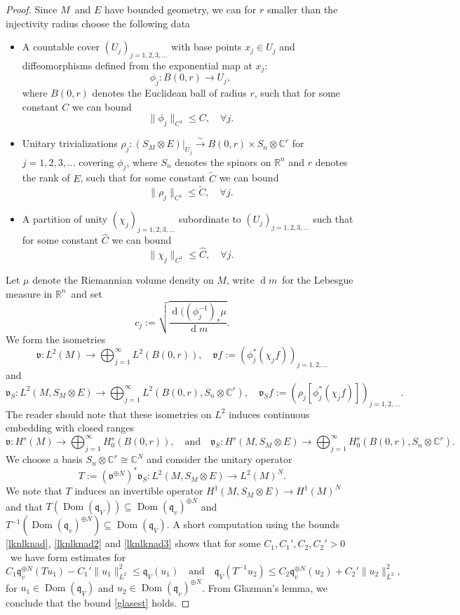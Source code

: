 \documentclass[a4paper,reqno]{amsart}
\numberwithin{equation}{section}
\def\Dom{\operatorname{Dom}}
\def\rd{\operatorname{d}\!}
\def\C{\mathbb{C}}
\def\R{\mathbb{R}}
\theoremstyle{definition}
\theoremstyle{remark}
\begin{document}
\begin{proof}
Since $M$ and $E$ have bounded geometry, we can for $r $ smaller than the injectivity radius choose the following data
\begin{itemize}
\item A countable cover $(U_j)_{j=1,2,3,\ldots}$ with base points $x_j\in U_j$ and diffeomorphisms defined from the exponential map at $x_j$:
$$\phi_j: B(0,r)\to U_j,$$
where $B(0,r)$ denotes the Euclidean ball of radius $r$, such that for some constant $C$ we can bound 
\begin{equation}
\label{lknlknad}
\|\phi_j\|_{C^1}\leq C,\quad \forall j.
\end{equation}
\item Unitary trivializations $\rho_j: (S_M\otimes E)|_{U_j}\xrightarrow{\sim} B(0,r)\times S_n\otimes \C^r$ for $j=1,2,3,\ldots$ covering $\phi_j$, where $S_n$ denotes the spinors on $\R^n$ and $r$ denotes the rank of $E$, such that for some constant $\tilde{C}$ we can bound 
\begin{equation}
\label{lknlknad2}
\|\rho_j\|_{C^1}\leq \tilde{C},\quad \forall j.
\end{equation}
\item A partition of unity $(\chi_j)_{j=1,2,3,\ldots}$ subordinate to $(U_j)_{j=1,2,3,\ldots}$ such that for some constant $\hat{C}$ we can bound  
\begin{equation}
\label{lknlknad3}
\|\chi_j\|_{C^1}\leq \hat{C},\quad \forall j.
\end{equation}
\end{itemize}
Let $\mu$ denote the Riemannian volume density on $M$, write $\rd m$ for the Lebesgue measure in $\R^n$ and set 
$$c_j:=\sqrt{\frac{\rd((\phi_j^{-1})_*\mu}{\rd m}}.$$
We form the isometries 
$$\mathfrak{v}:L^2(M)\to \bigoplus_{j=1}^\infty L^2(B(0,r)),\quad \mathfrak{v}f:=(\phi_j^*(\chi_j f))_{j=1,2,\ldots}$$
and 
$$\mathfrak{v}_S:L^2(M,S_M\otimes E)\to \bigoplus_{j=1}^\infty L^2(B(0,r),S_n\otimes \C^r),\quad \mathfrak{v}_Sf:=(\rho_j[\phi_j^*(\chi_j f)])_{j=1,2,\ldots}.$$
The reader should note that these isometries on $L^2$ induces continuous embedding with closed ranges
$$\mathfrak{v}:H^s(M)\to \bigoplus_{j=1}^\infty H^s_0(B(0,r)),\quad\mbox{and}\quad \mathfrak{v}_S:H^s(M,S_M\otimes E)\to \bigoplus_{j=1}^\infty H^s_0(B(0,r),S_n\otimes \C^r).$$
We choose a basis $S_n\otimes \C^r\cong \C^N$ and consider the unitary operator 
$$T:=(\mathfrak{v}^{\oplus N})^* \mathfrak{v}_S:L^2(M,S_M\otimes E)\to L^2(M)^N.$$
We note that $T$ induces an invertible operator $H^1(M,S_M\otimes E)\to H^1(M)^N$ and that $T(\Dom(\mathfrak{q}_{V}))\subseteq \Dom(\mathfrak{q}_{v})^{\oplus N}$ and $T^{-1}(\Dom(\mathfrak{q}_{v})^{\oplus N})\subseteq \Dom(\mathfrak{q}_{V})$. A short computation using the bounds \eqref{lknlknad}, \eqref{lknlknad2} and \eqref{lknlknad3} shows that for some $C_1,C_1',C_2,C_2'>0$ we have form estimates for 
$$C_1\mathfrak{q}^{\oplus N}_{v}(Tu_1)-C_1'\|u_1\|^2_{L^2}\leq \mathfrak{q}_{V}(u_1) \quad \mbox{and}\quad \mathfrak{q}_{V}(T^{-1}u_2)\leq C_2\mathfrak{q}^{\oplus N}_{v}(u_2)+C_2'\|u_2\|^2_{L^2},$$
for $u_1\in \Dom(\mathfrak{q}_{V})$ and $u_2\in \Dom(\mathfrak{q}_{v})^{\oplus N}$. From Glazman's lemma, we conclude that the bound \eqref{glasest} holds.
\end{proof}
\end{document}
